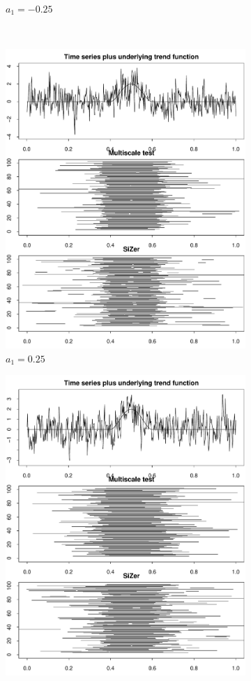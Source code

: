 \documentclass[a4paper,12pt]{article}
\begin{document}
\begin{figure}
\begin{subfigure}{.5\textwidth}
  \caption{$a_1 = -0.25$}
  \label{fig:sfig2}
\end{subfigure}\\
\begin{subfigure}{.5\textwidth}
  \centering
  \includegraphics[width=.9\linewidth]{Plots/min_int_with_T_500_a1_25.pdf}
  \caption{$a_1 = 0.25$}
  \label{fig:sfig3}
\end{subfigure}%
\begin{subfigure}{.5\textwidth}
  \centering
  \includegraphics[width=.9\linewidth]{Plots/min_int_with_T_500_a1_50.pdf}

\end{subfigure}
\end{figure}
\end{document}
